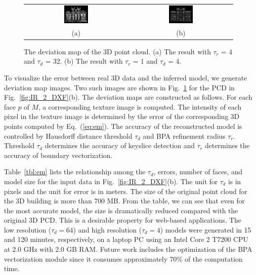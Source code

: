 \documentclass[10pt,journal,cspaper,compsoc]{IEEEtran}
\newcommand{\Eq}[1] {Eq.~(\ref{eq:#1})}
\newcommand{\Fig}[1]{Fig.~\ref{fig:#1}}
\newcommand{\Tbl}[1]{Table~\ref{tbl:#1}}
\newcommand{\Figb}[1]{Fig.~\ref{fig:#1}(b)}
\begin{document}
\begin{figure} [htbp]
\begin{center}
\begin{tabular}{cc}
\includegraphics[width=0.24\textwidth]{error_1000_32_4.png} &
\includegraphics[width=0.24\textwidth]{error_1000_4_1.png} \\
(a) & (b)
\end{tabular}
\end{center}
\caption{The deviation map of the 3D point cloud. 
(a) The result with $\tau_r$ = 4 and $\tau_d$ = 32.
(b) The result with $\tau_r$ = 1 and $\tau_d$ = 4. }
\label{fig:EM}
\end{figure}

To visualize the error between real 3D data and the inferred model,
we generate deviation map images.
Two such images are shown in \Fig{EM} for the PCD in
\Figb{IR_2_DXF}.
The deviation maps are constructed as follows.
For each face $p$ of $M$, a corresponding texture image is computed.
The intensity of each pixel in the texture image is determined by the error
of the corresponding 3D points computed by \Eq{em}.
The accuracy of the reconstructed model is controlled by Hausdorff distance
threshold $\tau_d$ and BPA refinement radius $\tau_r$.
Threshold $\tau_d$ determines the accuracy of keyslice detection and $\tau_r$
determines the accuracy of boundary vectorization.

\Tbl{em} lists the relationship among the $\tau_d$, errors,
number of faces, and model size for the input data in \Figb{IR_2_DXF}.
The unit for $\tau_d$ is in pixels and the unit for error is in meters.
The size of the original point cloud for the 3D building is more than 700 MB.
From the table, we can see that even for the most accurate model, 
the size is dramatically reduced compared with the original 3D PCD.
This is a desirable property for web-based applications.
The low resolution ($\tau_d = 64$) and high resolution ($\tau_d = 4$) models
were generated in 15 and 120 minutes, respectively,
on a laptop PC using an Intel Core 2 T7200 CPU at 2.0 GHz with 2.0 GB RAM.
Future work includes the optimization of the BPA vectorization module since
it consumes approximately 70\% of the computation time.
\end{document}
